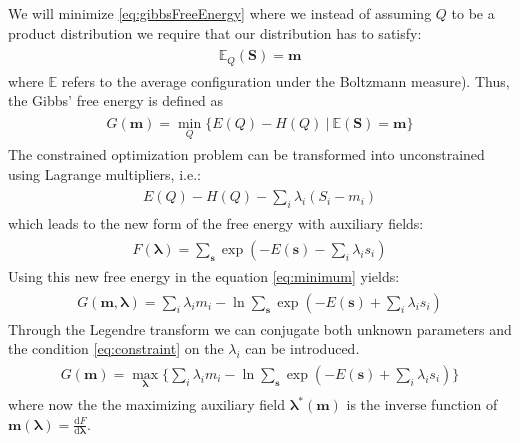 \documentclass[../report/report.tex]{subfiles}
\begin{document}
We will minimize \ref{eq:gibbsFreeEnergy} where we instead of assuming $Q$ to be a product distribution we require that our distribution has to satisfy:
\begin{align}
\begin{split}
\mathbb{E}_Q (\mathbf{S}) = \mathbf{m} 
\label{eq:constraint}
\end{split}
\end{align}
 where $\mathbb{E}$ refers to the average configuration under the Boltzmann measure). Thus, the Gibbs' free energy is defined as 
 \begin{align}
\begin{split}
G(\mathbf{m}) = \min_{Q} \{E(Q) - H(Q) ~|~\mathbb{E}(\mathbf{S}) = \mathbf{m} \}
\label{eq:minimum}
\end{split}
\end{align}
The constrained optimization problem can be transformed into unconstrained using Lagrange multipliers, i.e.:
 \begin{align}
\begin{split}
E(Q) - H(Q) -  \sum_i \lambda_i(S_i - m_i) 
\end{split}
\end{align}
which leads to the new form of the free energy with auxiliary fields:
 \begin{align}
\begin{split}
F(\boldsymbol{\lambda}) = \sum_{\mathbf{s}} \exp( -E(\mathbf{s}) -\sum_i \lambda_i s_i)
\end{split}
\end{align}
Using this new free energy in the equation \ref{eq:minimum} yields:
 \begin{align}
\begin{split}
G(\mathbf{m}, \boldsymbol{\lambda} ) = \sum_i \lambda_i m_i - \ln \sum_\mathbf{s} \exp(-E(\mathbf{s}) + \sum_i \lambda_i s_i)
\end{split}
\end{align}
Through the Legendre transform we can conjugate both unknown parameters and the condition \ref{eq:constraint} on the $\lambda_i$ can be introduced.
 \begin{align}
\begin{split}
G(\mathbf{m}) = \max_{\boldsymbol{\lambda}}\{ \sum_i \lambda_i m_i - \ln \sum_\mathbf{s} \exp(-E(\mathbf{s}) + \sum_i \lambda_i s_i) \}
\end{split}
\end{align}
where now the the maximizing auxiliary field $\boldsymbol{\lambda}^*(\mathbf{m})$ is the inverse function of $\mathbf{m}(\boldsymbol{\lambda}) = \frac{\text{d}F}{\text{d} \boldsymbol{\lambda}}$.
\end{document}
